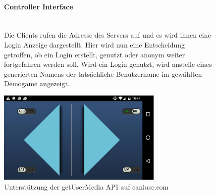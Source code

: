 \documentclass[a4paper]{spie}  %
\begin{document}
\begin{figure}[H]
\begin{minipage}[t]{0.4\textwidth}
\vspace{0pt}
\paragraph{Controller Interface}\mbox{}\\
Die Clients rufen die Adresse des Servers auf und es wird ihnen eine Login Anzeige dargestellt. Hier wird nun eine Entscheidung getroffen, ob ein Login erstellt, genutzt oder anonym weiter fortgefahren werden soll.
Wird ein Login genutzt, wird anstelle eines generierten Namens der tatsächliche Benutzername im gewählten Demogame angezeigt.

\end{minipage}
\hfill
\begin{minipage}[t]{0.5\textwidth}
\vspace{0pt}
    \includegraphics[width=8cm]{images/controllerLayoutModern}
     \caption{Unterstützung der getUserMedia API auf caniuse.com}
		\label{fig:test2}
\end{minipage}
\end{figure}
\end{document}
